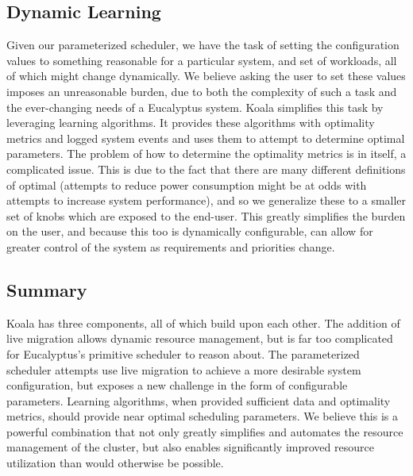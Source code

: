 \subsection{Dynamic Learning}
Given our parameterized scheduler, we have the task of setting the configuration values to something reasonable for a particular system, and set of workloads, all of which might change dynamically.  We believe asking the user to set these values imposes an unreasonable burden, due to both the complexity of such a task and the ever-changing needs of a Eucalyptus system.  Koala simplifies this task by leveraging learning algorithms.  It provides these algorithms with optimality metrics and logged system events and uses them to attempt to determine optimal parameters.  The problem of how to determine the optimality metrics is in itself, a complicated issue.  This is due to the fact that there are many different definitions of optimal (attempts to reduce power consumption might be at odds with attempts to increase system performance), and so we generalize these to a smaller set of knobs which are exposed to the end-user.  This greatly simplifies the burden on the user, and because this too is dynamically configurable, can allow for greater control of the system as requirements and priorities change.

\subsection{Summary}

Koala has three components, all of which build upon each other.  The addition of live migration allows dynamic resource management, but is far too complicated for Eucalyptus's primitive scheduler to reason about.  The parameterized scheduler attempts use live migration to achieve a more desirable system configuration, but exposes a new challenge in the form of configurable parameters.  Learning algorithms, when provided sufficient data and optimality metrics, should provide near optimal scheduling parameters.  We believe this is a powerful combination that not only greatly simplifies and automates the resource management of the cluster, but also enables significantly improved resource utilization than would otherwise be possible.
